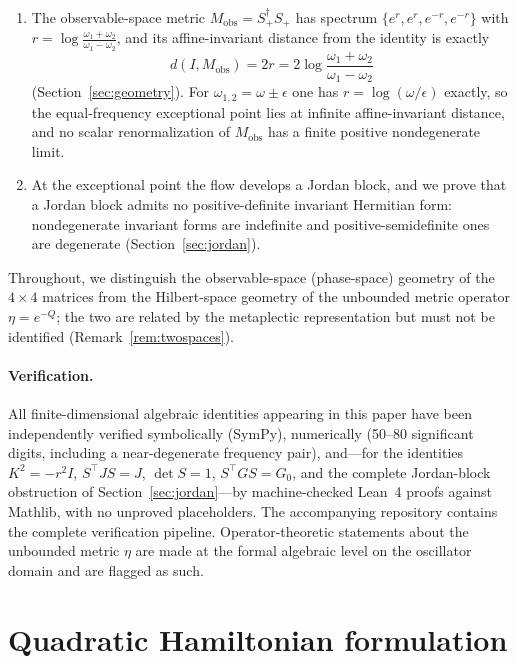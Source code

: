 \documentclass[11pt]{article}
\theoremstyle{definition}
\theoremstyle{remark}
\newcommand{\w}{\omega}
\newcommand{\Mobs}{M_{\mathrm{obs}}}
\newcommand{\dg}{\dagger}
\begin{document}
\begin{enumerate}
\item The observable-space metric $\Mobs=S_+^{\dg}S_+$ has spectrum
$\{e^{r},e^{r},e^{-r},e^{-r}\}$ with
$r=\log\frac{\w_1+\w_2}{\w_1-\w_2}$, and its affine-invariant distance from
the identity is exactly
\begin{equation}
d(I,\Mobs)=2r=2\log\frac{\w_1+\w_2}{\w_1-\w_2}
\end{equation}
(Section~\ref{sec:geometry}).  For $\w_{1,2}=\w\pm\epsilon$ one has
$r=\log(\w/\epsilon)$ exactly, so the equal-frequency exceptional point lies
at infinite affine-invariant distance, and no scalar renormalization of
$\Mobs$ has a finite positive nondegenerate limit.

\item At the exceptional point the flow develops a Jordan block, and we prove
that a Jordan block admits no positive-definite invariant Hermitian form:
nondegenerate invariant forms are indefinite and positive-semidefinite ones
are degenerate (Section~\ref{sec:jordan}).
\end{enumerate}

Throughout, we distinguish the observable-space (phase-space) geometry of the
$4\times4$ matrices from the Hilbert-space geometry of the unbounded metric
operator $\eta=e^{-Q}$; the two are related by the metaplectic representation
but must not be identified (Remark~\ref{rem:twospaces}).

\paragraph{Verification.}
All finite-dimensional algebraic identities appearing in this paper have been
independently verified symbolically (SymPy), numerically (50--80 significant
digits, including a near-degenerate frequency pair), and---for the identities
$K^2=-r^2I$, $S^{\top}JS=J$, $\det S=1$, $S^{\top}GS=G_0$, and the complete
Jordan-block obstruction of Section~\ref{sec:jordan}---by machine-checked
Lean~4 proofs against Mathlib, with no unproved placeholders.  The
accompanying repository contains the complete verification pipeline.
Operator-theoretic statements about the unbounded metric $\eta$ are made at
the formal algebraic level on the oscillator domain and are flagged as such.

\section{Quadratic Hamiltonian formulation}\label{sec:setup}
\end{document}

